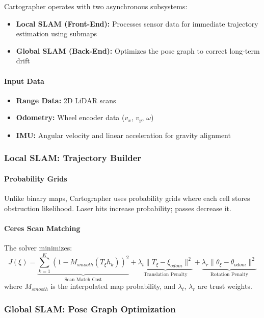 Cartographer operates with two asynchronous subsystems:
\begin{itemize}
    \item \textbf{Local SLAM (Front-End):} Processes sensor data for immediate trajectory estimation using submaps
    \item \textbf{Global SLAM (Back-End):} Optimizes the pose graph to correct long-term drift
\end{itemize}

\paragraph{Input Data}
\begin{itemize}
    \item \textbf{Range Data:} 2D LiDAR scans
    \item \textbf{Odometry:} Wheel encoder data ($v_x$, $v_y$, $\omega$)
    \item \textbf{IMU:} Angular velocity and linear acceleration for gravity alignment
\end{itemize}

\subsubsection{Local SLAM: Trajectory Builder}

\paragraph{Probability Grids}
Unlike binary maps, Cartographer uses probability grids where each cell stores obstruction likelihood. Laser hits increase probability; passes decrease it.

\paragraph{Ceres Scan Matching}
The solver minimizes:
\begin{equation}
J(\xi) = \underbrace{\sum_{k=1}^{K} (1 - M_{smooth}(T_{\xi} h_k))^2}_{\text{Scan Match Cost}} + \underbrace{\lambda_t \|T_{\xi} - \xi_{odom}\|^2}_{\text{Translation Penalty}} + \underbrace{\lambda_r \|\theta_{\xi} - \theta_{odom}\|^2}_{\text{Rotation Penalty}}
\label{eq:ceres_cost}
\end{equation}
where $M_{smooth}$ is the interpolated map probability, and $\lambda_t$, $\lambda_r$ are trust weights.

\subsubsection{Global SLAM: Pose Graph Optimization}


